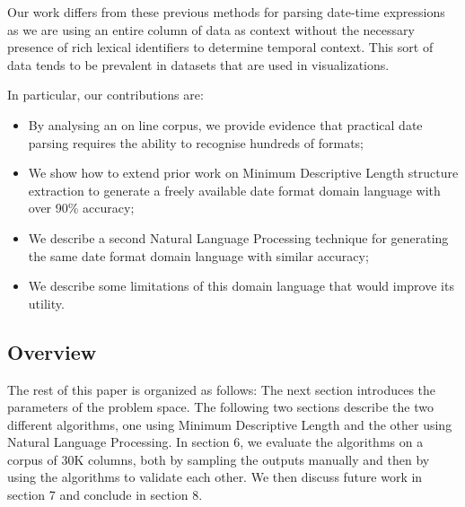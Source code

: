 Our work differs from these previous methods for parsing date-time expressions as we are using an entire column of data as context without the necessary presence of rich lexical identifiers to determine temporal context. This sort of data tends to be prevalent in datasets that are used in visualizations. 

In particular, our contributions are:
\begin{itemize}
\item By analysing an on line corpus, we provide evidence that practical date parsing requires the ability to recognise hundreds of formats;
\item We show how to extend prior work on Minimum Descriptive Length structure extraction to generate a freely available date format domain language with over 90\% accuracy;
\item We describe a second Natural Language Processing technique for generating the same date format domain language with similar accuracy;
\item We describe some limitations of this domain language that would improve its utility.
\end{itemize}


\subsection{Overview}
The rest of this paper is organized as follows: The next section introduces the parameters of the problem space. The following two sections describe the two different algorithms, one using Minimum Descriptive Length and the other using Natural Language Processing. In section 6, we evaluate the algorithms on a corpus of 30K columns, both by sampling the outputs manually and then by using the algorithms to validate each other. We then discuss future work in section 7 and conclude in section 8.

